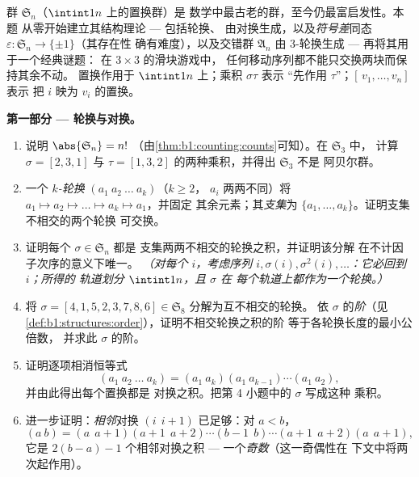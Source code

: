 \begin{problem}\label{pb:b1:structures:1}
群 $\mathfrak S_n$（$\intint1n$ 上的置换群）是
数学中最古老的群，至今仍最富启发性。本题
从零开始建立其结构理论 --- 包括轮换、
由对换生成，以及\emph{符号差}同态
$\varepsilon \colon \mathfrak S_n \to \{\pm1\}$（其存在性
确有难度），以及交错群 $\mathfrak A_n$
由 $3$-轮换生成 --- 再将其用于一个经典谜题：
在 $3 \times 3$ 的滑块游戏中，
任何移动序列都不能只交换两块而保持其余不动。
置换作用于 $\intint1n$ 上；乘积 $\sigma\tau$ 表示
“先作用 $\tau$”；$[\,v_1, \dots, v_n]$ 表示
把 $i$ 映为 $v_i$ 的置换。

\medskip
\noindent\textbf{第一部分 --- 轮换与对换。}
\begin{enumerate}
  \item 说明 $\abs{\mathfrak S_n} = n!$
        （由\cref{thm:b1:counting:counts}可知）。在 $\mathfrak S_3$ 中，
        计算 $\sigma = [2, 3, 1]$ 与 $\tau =
        [1, 3, 2]$ 的两种乘积，并得出 $\mathfrak S_3$ 不是
        阿贝尔群。
  \item 一个 \emph{$k$-轮换} $(a_1\ a_2\ \dots\ a_k)$（$k \geq 2$，
        $a_i$ 两两不同）将 $a_1 \mapsto a_2
        \mapsto \dots \mapsto a_k \mapsto a_1$，并固定
        其余元素；其\emph{支集}为 $\{a_1, \dots,
        a_k\}$。证明支集不相交的两个轮换
        可交换。
  \item 证明每个 $\sigma \in \mathfrak S_n$ 都是
        支集两两不相交的轮换之积，并证明该分解
        在不计因子次序的意义下唯一。
        \emph{（对每个 $i$，考虑序列 $i, \sigma(i),
        \sigma^2(i), \dots$：它必回到 $i$；所得的
        \emph{轨道}划分 $\intint1n$，且 $\sigma$ 在
        每个轨道上都作为一个轮换。）}
  \item 将 $\sigma = [4, 1, 5, 2, 3, 7, 8, 6] \in
        \mathfrak S_8$ 分解为互不相交的轮换。
        依 $\sigma$ 的\emph{阶}（见
        \cref{def:b1:structures:order}），证明不相交轮换之积的阶
        等于各轮换长度的最小公倍数，
        并求此 $\sigma$ 的阶。
  \item 证明逐项相消恒等式
        \[
        (a_1\ a_2\ \dots\ a_k)
        = (a_1\ a_k)(a_1\ a_{k-1})\cdots(a_1\ a_2) ,
        \]
        并由此得出每个置换都是
        对换之积。把第 4 小题中的 $\sigma$ 写成这种
        乘积。
  \item 进一步证明：\emph{相邻}对换
        $(i\ \ i{+}1)$ 已足够：对 $a < b$，
        \[
        (a\ b) = (a\ \ a{+}1)(a{+}1\ \ a{+}2)\cdots(b{-}1\ \ b)
        \cdots(a{+}1\ \ a{+}2)(a\ \ a{+}1),
        \]
        它是 $2(b - a) - 1$ 个相邻对换之积 ---
        一个\emph{奇数}（这一奇偶性在
        下文中将两次起作用）。
\end{enumerate}


\end{problem}

